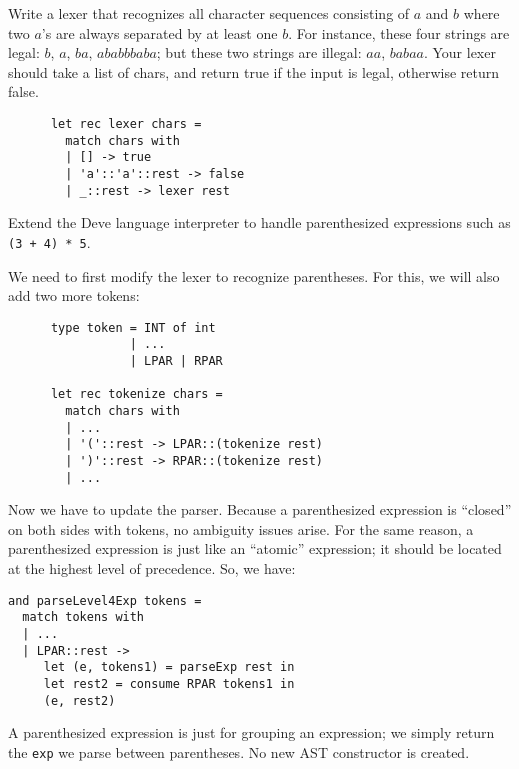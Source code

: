 \documentclass[addpoints]{exam}
\begin{document}
\begin{questions}
  
  \question
  Write a lexer that recognizes all character sequences
  consisting of 
  $a$ and $b$ where two $a$'s are always separated by at least one $b$.
  For instance, these four strings are legal: $b$, $a$, $ba$, $ababbbaba$;
  but these two strings are illegal: $aa$, $babaa$.
  Your lexer should take a list of chars, and return
  true if the input is legal, otherwise return false.

  \begin{solutionbox}{3.5cm}
    \begin{verbatim}
      let rec lexer chars =
        match chars with
        | [] -> true
        | 'a'::'a'::rest -> false
        | _::rest -> lexer rest      
    \end{verbatim}    
  \end{solutionbox}


  \question
  Extend the Deve language interpreter to handle parenthesized expressions
  such as \texttt{(3 + 4) * 5}.

  \begin{solution}
    We need to first modify the lexer to recognize parentheses.
    For this, we will also add two more tokens:
    
    \begin{verbatim}
      type token = INT of int
                 | ...
                 | LPAR | RPAR

      let rec tokenize chars =
        match chars with
        | ...
        | '('::rest -> LPAR::(tokenize rest)
        | ')'::rest -> RPAR::(tokenize rest)
        | ...
    \end{verbatim}

    Now we have to update the parser.
    Because a parenthesized expression is
    ``closed'' on both sides with tokens,
    no ambiguity issues arise. For the same reason,
    a parenthesized expression is just like an ``atomic''
    expression; it should be located at the highest level of precedence.
    So, we have:

    \begin{verbatim}
and parseLevel4Exp tokens =
  match tokens with
  | ...
  | LPAR::rest ->
     let (e, tokens1) = parseExp rest in
     let rest2 = consume RPAR tokens1 in
     (e, rest2)
    \end{verbatim}

    A parenthesized expression is just for grouping an expression;
    we simply return the \texttt{exp} we parse between parentheses.
    No new AST constructor is created.
  \end{solution}
  

\end{questions}
\end{document}
